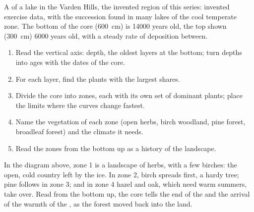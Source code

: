 \begin{omfigure}

{\small A  of a lake in the Varden Hills, the invented region
of this series: invented exercise data, with the succession found in many
lakes of the cool temperate zone. The bottom of the core (\qty{600}{cm}) is
\num{14000} years old, the top shown (\qty{300}{cm}) \num{6000} years old,
with a steady rate of deposition between.}
\end{omfigure}

\begin{method}
\begin{enumerate}
  \item Read the vertical axis: depth, the oldest layers at the bottom;
        turn depths into ages with the dates of the core.
  \item For each layer, find the plants with the largest shares.
  \item Divide the core into zones, each with its own set of dominant
        plants; place the limits where the curves change fastest.
  \item Name the vegetation of each zone (open herbs, birch woodland, pine
        forest, broadleaf forest) and the climate it needs.
  \item Read the zones from the bottom up as a history of the landscape.
\end{enumerate}
\end{method}

In the diagram above, zone 1 is a landscape of herbs, with a few birches: the
open, cold country left by the ice. In zone 2, birch spreads first, a hardy
tree; pine follows in zone 3; and in zone 4 hazel and oak, which need warm
summers, take over. Read from the bottom up, the core tells the end of the
 and the arrival of the warmth of the , as the
forest moved back into the land.

